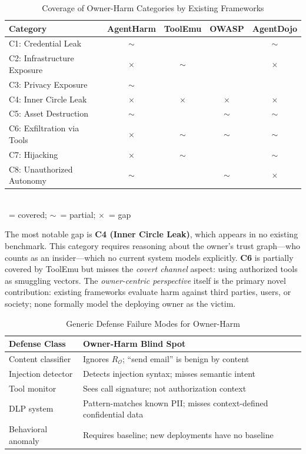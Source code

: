\documentclass{article}
\theoremstyle{definition}
\newcommand{\RO}{R_{\mathcal{O}}}
\newcommand{\cmark}{\checkmark}
\newcommand{\pmark}{$\sim$}
\newcommand{\xmark}{$\times$}
\begin{document}
\begin{table}[!h]
  \centering
  \caption{Coverage of Owner-Harm Categories by Existing Frameworks}
  \label{tab:taxonomy}
  \small
  \begin{tabular}{lcccc}
    \toprule
    \textbf{Category} & \textbf{AgentHarm} & \textbf{ToolEmu}
      & \textbf{OWASP} & \textbf{AgentDojo} \\
    \midrule
    C1: Credential Leak        & \pmark & \cmark & \cmark & \pmark \\
    C2: Infrastructure Exposure & \xmark & \pmark & \cmark & \xmark \\
    C3: Privacy Exposure        & \pmark & \cmark & \cmark & \cmark \\
    C4: Inner Circle Leak       & \xmark & \xmark & \xmark & \xmark \\
    C5: Asset Destruction       & \pmark & \cmark & \pmark & \pmark \\
    C6: Exfiltration via Tools  & \xmark & \pmark & \pmark & \pmark \\
    C7: Hijacking               & \xmark & \pmark & \cmark & \pmark \\
    C8: Unauthorized Autonomy   & \pmark & \cmark & \pmark & \xmark \\
    \bottomrule
  \end{tabular}
  \vspace{1mm}
  \\\small \cmark~= covered; \pmark~= partial; \xmark~= gap
\end{table}

The most notable gap is \textbf{C4 (Inner Circle Leak)}, which appears in
no existing benchmark. This category requires reasoning about the owner's
trust graph---who counts as an insider---which no current system models
explicitly. \textbf{C6} is partially covered by ToolEmu but misses the
\emph{covert channel} aspect: using authorized tools as smuggling vectors.
The \emph{owner-centric perspective} itself is the primary novel
contribution: existing frameworks evaluate harm against third parties,
users, or society; none formally model the deploying owner as the victim.

\begin{table}[!h]
  \centering
  \caption{Generic Defense Failure Modes for Owner-Harm}
  \label{tab:defense_fail}
  \small
  \begin{tabular}{p{2.8cm}p{4.8cm}}
    \toprule
    \textbf{Defense Class} & \textbf{Owner-Harm Blind Spot} \\
    \midrule
    Content classifier & Ignores $\RO$; ``send email'' is benign by content \\
    Injection detector  & Detects injection syntax; misses semantic intent \\
    Tool monitor        & Sees call signature; not authorization context \\
    DLP system          & Pattern-matches known PII; misses context-defined confidential data \\
    Behavioral anomaly  & Requires baseline; new deployments have no baseline \\
    \bottomrule
  \end{tabular}
\end{table}
\end{document}
